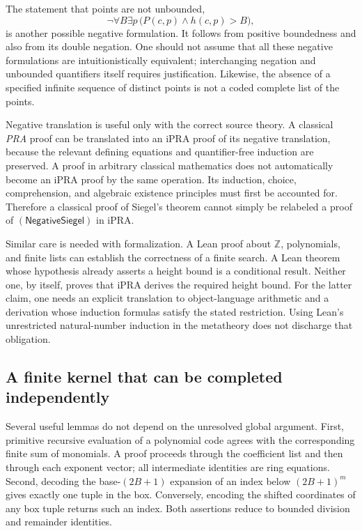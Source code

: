 The statement that points are not unbounded,
\[
 \neg\forall B\exists p\,
                    \bigl(P(c,p)\wedge h(c,p)>B\bigr),
\]
is another possible negative formulation.  It follows from positive
boundedness and also from its double negation.  One should not assume
that all these negative formulations are intuitionistically equivalent;
interchanging negation and unbounded quantifiers itself requires
justification.  Likewise, the absence of a specified infinite sequence
of distinct points is not a coded complete list of the points.

Negative translation is useful only with the correct source theory.
A classical \emph{PRA} proof can be translated into an iPRA proof of
its negative translation, because the relevant defining equations and
quantifier-free induction are preserved.  A proof in arbitrary classical
mathematics does not automatically become an iPRA proof by the same
operation.  Its induction, choice, comprehension, and algebraic
existence principles must first be accounted for.  Therefore a classical
proof of Siegel's theorem cannot simply be relabeled a proof of
$(\mathsf{NegativeSiegel})$ in iPRA.

Similar care is needed with formalization.  A Lean proof about
$\mathbb Z$, polynomials, and finite lists can establish the correctness
of a finite search.  A Lean theorem whose hypothesis already asserts a
height bound is a conditional result.  Neither one, by itself, proves
that iPRA derives the required height bound.  For the latter claim,
one needs an explicit translation to object-language arithmetic and a
derivation whose induction formulas satisfy the stated restriction.
Using Lean's unrestricted natural-number induction in the metatheory
does not discharge that obligation.

\subsection{A finite kernel that can be completed independently}

Several useful lemmas do not depend on the unresolved global argument.
First, primitive recursive evaluation of a polynomial code agrees with
the corresponding finite sum of monomials.  A proof proceeds through
the coefficient list and then through each exponent vector; all
intermediate identities are ring equations.  Second, decoding the
base-$(2B+1)$ expansion of an index below $(2B+1)^m$ gives exactly one
tuple in the box.  Conversely, encoding the shifted coordinates of
any box tuple returns such an index.  Both assertions reduce to
bounded division and remainder identities.

